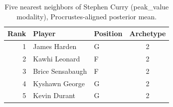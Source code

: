 \begin{table}[htbp]
  \centering\small
  \begin{tabular}{rllc}
    \toprule
    Rank & Player & Position & Archetype \\
    \midrule
    1 & James Harden & G & 2 \\
    2 & Kawhi Leonard & F & 2 \\
    3 & Brice Sensabaugh & F & 2 \\
    4 & Kyshawn George & G & 2 \\
    5 & Kevin Durant & G & 2 \\
    \bottomrule
  \end{tabular}
  \caption{Five nearest neighbors of Stephen Curry (peak_value modality), Procrustes-aligned posterior mean.}
  \label{tab:Stephen_Curry_neighbors_peak_value}
\end{table}

